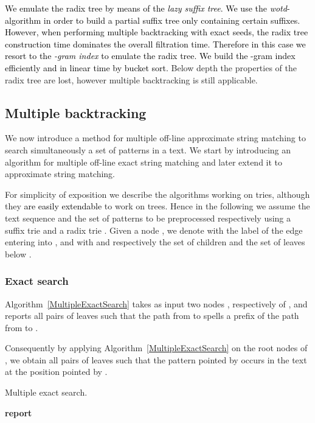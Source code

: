 \documentclass[a4,center,fleqn]{article}
\newcommand{\Report}{\textbf{report }}
\begin{document}
\textcolor{black}{
We emulate the radix tree by means of the \emph{lazy suffix tree}.
We use the \emph{wotd}-algorithm \cite{Giegerich1999} in order to build a partial suffix tree only containing certain suffixes.
However, when performing multiple backtracking with exact seeds, the radix tree construction time dominates the overall filtration time.
Therefore in this case we resort to the \emph{-gram index} to emulate the radix tree.
We build the -gram index efficiently and in linear time by bucket sort.}
Below depth  the properties of the radix tree are lost, however multiple backtracking is still applicable.


\subsection{Multiple backtracking}
\label{sub:MultipleBacktracking}

We now introduce a method for multiple off-line approximate string matching to search simultaneously a set of patterns in a text.
We start by introducing an algorithm for multiple off-line exact string matching and later extend it to approximate string matching.

For simplicity of exposition we describe the algorithms working on tries, although they \textcolor{black}{are easily extendable} to work on trees.
Hence in the following we assume the text sequence and the set of patterns to be preprocessed respectively using a suffix trie  and a radix trie .
Given a node , we denote with  the label of the edge entering into , and with  and  respectively the set of children and the set of leaves below .

\subsubsection{Exact search}

Algorithm~\ref{MultipleExactSearch} takes as input two nodes ,  respectively of ,  and reports all pairs of leaves  such that the path from  to  spells a prefix of the path from  to .


Consequently by applying Algorithm~\ref{MultipleExactSearch} on the root nodes of ,  we obtain all pairs of leaves  such that the pattern pointed by  occurs in the text at the position pointed by .

\vspace*{2mm}
\begin{algorithm}
\caption{Multiple exact search.}
\label{MultipleExactSearch}
\begin{algorithmic}[1]
		\State \Report 
	\Else
		\ForAll {}
			\If {}
				\State {}
			\EndIf
		\EndFor
	\EndIf
\EndProcedure
\end{algorithmic}
\end{algorithm}
\end{document}
